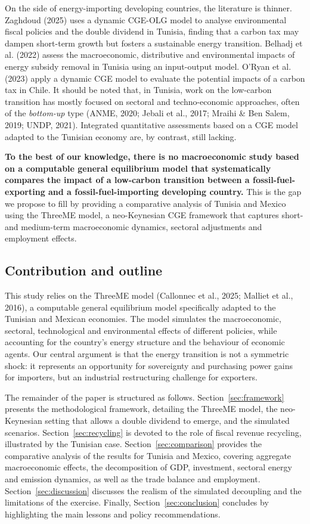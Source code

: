 \documentclass[12pt, a4paper]{article}
\begin{document}
On the side of energy-importing developing countries, the literature is thinner. Zaghdoud (2025) uses a dynamic CGE-OLG model to analyse environmental fiscal policies and the double dividend in Tunisia, finding that a carbon tax may dampen short-term growth but fosters a sustainable energy transition. Belhadj et al. (2022) assess the macroeconomic, distributive and environmental impacts of energy subsidy removal in Tunisia using an input-output model. O'Ryan et al. (2023) apply a dynamic CGE model to evaluate the potential impacts of a carbon tax in Chile. It should be noted that, in Tunisia, work on the low-carbon transition has mostly focused on sectoral and techno-economic approaches, often of the \textit{bottom-up} type (ANME, 2020; Jebali et al., 2017; Mraihi \& Ben Salem, 2019; UNDP, 2021). Integrated quantitative assessments based on a CGE model adapted to the Tunisian economy are, by contrast, still lacking.

\textbf{To the best of our knowledge, there is no macroeconomic study based on a computable general equilibrium model that systematically compares the impact of a low-carbon transition between a fossil-fuel-exporting and a fossil-fuel-importing developing country.} This is the gap we propose to fill by providing a comparative analysis of Tunisia and Mexico using the ThreeME model, a neo-Keynesian CGE framework that captures short- and medium-term macroeconomic dynamics, sectoral adjustments and employment effects.

\subsection{Contribution and outline}

This study relies on the ThreeME model (Callonnec et al., 2025; Malliet et al., 2016), a computable general equilibrium model specifically adapted to the Tunisian and Mexican economies. The model simulates the macroeconomic, sectoral, technological and environmental effects of different policies, while accounting for the country's energy structure and the behaviour of economic agents. Our central argument is that the energy transition is not a symmetric shock: it represents an opportunity for sovereignty and purchasing power gains for importers, but an industrial restructuring challenge for exporters.

The remainder of the paper is structured as follows. Section~\ref{sec:framework} presents the methodological framework, detailing the ThreeME model, the neo-Keynesian setting that allows a double dividend to emerge, and the simulated scenarios. Section~\ref{sec:recycling} is devoted to the role of fiscal revenue recycling, illustrated by the Tunisian case. Section~\ref{sec:comparison} provides the comparative analysis of the results for Tunisia and Mexico, covering aggregate macroeconomic effects, the decomposition of GDP, investment, sectoral energy and emission dynamics, as well as the trade balance and employment. Section~\ref{sec:discussion} discusses the realism of the simulated decoupling and the limitations of the exercise. Finally, Section~\ref{sec:conclusion} concludes by highlighting the main lessons and policy recommendations.
\end{document}
